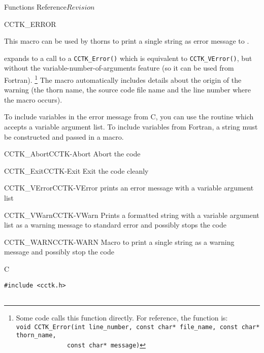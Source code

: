 \begin{cactuspart}{ Functions Reference}{}{$Revision$}
\begin{FunctionDescription}{CCTK\_ERROR}
\begin{Discussion}
This macro can be used by thorns to print a single string as error
message to .

 expands to a call to a \verb|CCTK_Error()|
which is equivalent to \verb|CCTK_VError()|, but without the
variable-number-of-arguments feature (so it can be used from
Fortran).%
\footnote{%
         Some code calls this function directly.
         For reference, the function is:\\
         \texttt{\hbox{}void CCTK\_Error(int line\_number, const char* file\_name, const char* thorn\_name,}\\
         \texttt{\hbox{}~~~~~~~~~~~~~~const char* message)}
         }%
{}  The macro automatically includes details about the origin of the warning
(the thorn name, the source code file name and the line number where the macro
occurs).

To include variables in the error message from C, you can use the routine
 which accepts a variable argument list.
To include variables from Fortran, a string must be constructed and passed
in a  macro.
\end{Discussion}

\begin{SeeAlsoSection}
\begin{SeeAlso2}{CCTK\_Abort}{CCTK-Abort}
Abort the code
\end{SeeAlso2}
\begin{SeeAlso2}{CCTK\_Exit}{CCTK-Exit}
Exit the code cleanly
\end{SeeAlso2}
\begin{SeeAlso2}{CCTK\_VError}{CCTK-VError}
prints an error message with a variable argument list
\end{SeeAlso2}
\begin{SeeAlso2}{CCTK\_VWarn}{CCTK-VWarn}
Prints a formatted string with a variable argument list as a warning
message to standard error and possibly stops the code
\end{SeeAlso2}
\begin{SeeAlso2}{CCTK\_WARN}{CCTK-WARN}
Macro to print a single string as a warning message and possibly stop the code
\end{SeeAlso2}
\end{SeeAlsoSection}

\begin{ExampleSection}
\begin{Example}{C}
\begin{verbatim}
#include <cctk.h>


\end{verbatim}
\end{Example}
\end{ExampleSection}
\end{FunctionDescription}
\end{cactuspart}
